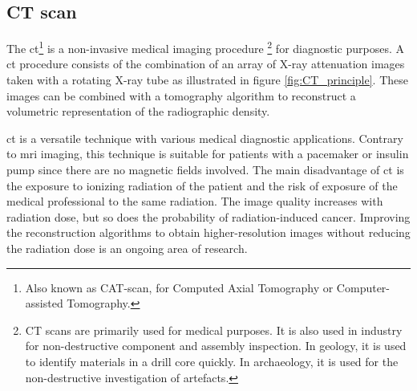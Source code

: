 \subsection{CT scan}
\par{
    The \acrfull{ct}\footnote{Also known as CAT-scan, for Computed Axial Tomography or Computer-assisted Tomography.} is a non-invasive medical imaging procedure
    \footnote{CT scans are primarily used for medical purposes. 
    It is also used in industry for non-destructive component and assembly inspection.
    In geology, it is used to identify materials in a drill core quickly. In archaeology, it is used for the non-destructive investigation of artefacts. } 
    for diagnostic purposes. 
    A \acrlong{ct} procedure consists of the combination of an array of X-ray attenuation images taken with a rotating X-ray tube as illustrated in figure \ref{fig:CT_principle}. 
    These images can be combined with a tomography algorithm to reconstruct a volumetric representation of the radiographic density.
}
\par{
    \acrshort{ct} is a versatile technique with various medical diagnostic applications. 
    Contrary to \acrfull{mri} imaging, this technique is suitable for patients with a pacemaker or insulin pump since there are no magnetic fields involved.
    The main disadvantage of \acrshort{ct} is the exposure to ionizing radiation of the patient and the risk of exposure of the medical professional to the same radiation.
    The image quality increases with radiation dose, but so does the probability of radiation-induced cancer.
    Improving the reconstruction algorithms to obtain higher-resolution images without reducing the radiation dose is an ongoing area of research. 
}


